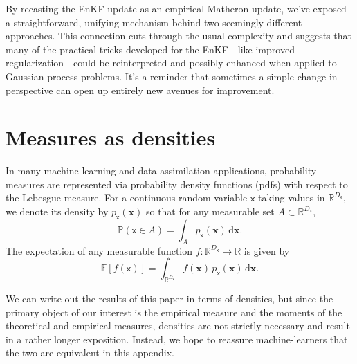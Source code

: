 \documentclass[wcp]{jmlr} %
\newcommand{\Ex}{\mathbb{E}}
\newcommand{\vv}[1]{\boldsymbol{#1}}
\newcommand{\rv}[1]{\mathsf{#1}}
\newcommand{\vrv}[1]{\vv{\rv{#1}}}
\renewcommand{\Pr}{\mathbb{P}}
\begin{document}
By recasting the EnKF update as an empirical Matheron update, we’ve exposed a straightforward, unifying mechanism behind two seemingly different approaches. This connection cuts through the usual complexity and suggests that many of the practical tricks developed for the EnKF—like improved regularization—could be reinterpreted and possibly enhanced when applied to Gaussian process problems. It’s a reminder that sometimes a simple change in perspective can open up entirely new avenues for improvement.




\appendix

\section{Measures as densities}\label{sec:densities-please}

In many machine learning and data assimilation applications, probability measures are represented via probability density functions (pdfs) with respect to the Lebesgue measure. For a continuous random variable \(\vrv{x}\) taking values in \(\mathbb{R}^{D_{\vrv{x}}}\), we denote its density by \(p_{\vrv{x}}(\vv{x})\) so that for any measurable set \(A \subset \mathbb{R}^{D_{\vrv{x}}}\),
\begin{equation}
    \Pr\left(\vrv{x} \in A\right)
    = \int_A p_{\vrv{x}}(\vv{x})\,\mathrm{d}\vv{x}.
\end{equation}
The expectation of any measurable function \(f:\mathbb{R}^{D_{\vrv{x}}}\to\mathbb{R}\) is given by
\begin{equation}
    \Ex[f(\vrv{x})] = \int_{\mathbb{R}^{D_{\vrv{x}}}} f(\vv{x})\,p_{\vrv{x}}(\vv{x})\,\mathrm{d}\vv{x}.
\end{equation}

We can write out the results of this paper in terms of densities, but since the primary object of our interest is the empirical measure and the moments of the theoretical and empirical measures, densities are not strictly necessary and result in a rather longer exposition.
Instead, we hope to reassure machine-learners that the two are equivalent in this appendix.
\end{document}

